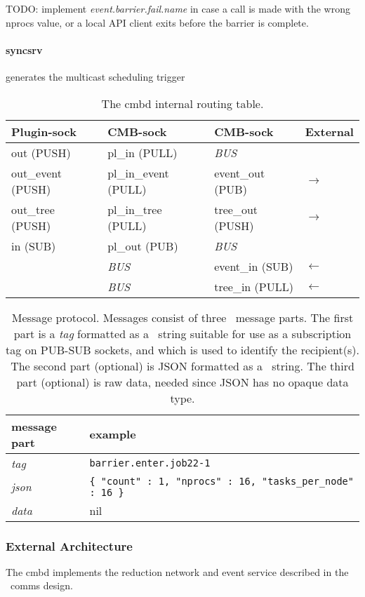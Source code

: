 TODO: implement {\em event.barrier.fail.name} in case a call is made with
the wrong nprocs value, or a local API client exits before the barrier is
complete.
\paragraph{syncsrv}
generates the multicast scheduling trigger

\begin{table}
\centering
\begin{tabular}{|l|l|l|l|}\hline
\textbf{Plugin-sock} & \textbf{CMB-sock} & \textbf{CMB-sock}
					 & \textbf{External} \\
\hline
out (PUSH)		& pl\_in (PULL)	& {\em BUS} & \\
out\_event (PUSH)  & pl\_in\_event (PULL) & event\_out (PUB) & $\rightarrow$ \\
out\_tree (PUSH) & pl\_in\_tree	(PULL) & tree\_out (PUSH) & $\rightarrow$ \\
in (SUB)	& pl\_out (PUB)	& {\em BUS}     & \\
\hline
		& {\em BUS}	& event\_in (SUB) & $\leftarrow$ \\
		& {\em BUS}	& tree\_in (PULL) & $\leftarrow$ \\
\hline
\end{tabular}
\caption{The cmbd internal routing table.}
\label{tab:cmbrouting}
\end{table}

\begin{table}
\centering
\begin{tabular}{|l|p{11cm}|}\hline
\textbf{message part} & \textbf{example} \\
\hline
{\em tag} & {\tt barrier.enter.job22-1} \\
\hline
{\em json} & {\tt \{ "count" : 1, "nprocs" : 16, "tasks\_per\_node" : 16 \} }\\
\hline
{\em data} & nil\\
\hline
\end{tabular}
\caption{Message protocol.  Messages consist of three \zMQ\ message parts.
The first part is a {\em tag} formatted as a \zMQ\ string suitable for
use as a subscription tag on PUB-SUB sockets, and which is used to identify
the recipient(s).
The second part (optional) is JSON formatted as a \zMQ\ string.
The third part (optional) is raw data, needed since JSON has no opaque
data type.}
\label{tab:cmbproto}
\end{table}

\subsubsection {External Architecture}
The cmbd implements the reduction network and event service described
in the \ngrm\ comms design.

